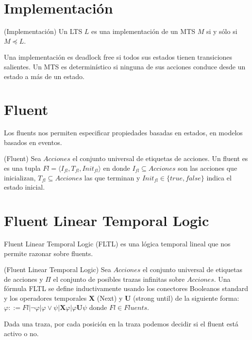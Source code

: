 \section{Implementación}

\begin{definition}{(Implementación)}
Un LTS $L$ es una implementación de un MTS $M$ si y sólo si $M \preceq L$.
\end{definition}

Una implementación es deadlock free si todos sus estados tienen transiciones salientes. 
Un MTS es determinístico si ninguna de sus acciones conduce desde un estado a más de un estado.

\section{Fluent}

Los fluents nos permiten especificar propiedades basadas en estados, en modelos basados en eventos.

\begin{definition}{(Fluent)}
Sea $Acciones$ el conjunto universal de etiquetas de acciones. 
Un fluent es es una tupla $Fl = \langle I_{fl}, T_{fl}, Init_{fl} \rangle$ en donde $I_{fl} \subseteq Acciones$ son las acciones 
que inicializan, $T_{fl} \subseteq Acciones$ las que terminan y $Init_{fl} \in \{true, false\}$ indica el estado inicial.
\end{definition}

\section{Fluent Linear Temporal Logic}
Fluent Linear Temporal Logic \cite{FLTL} (FLTL) es una lógica temporal lineal que nos permite razonar sobre fluents.

\begin{definition}{(Fluent Linear Temporal Logic)}
Sea $Acciones$ el conjunto universal de etiquetas de acciones y $\Pi$ el conjunto de posibles trazas infinitas sobre $Acciones$. 
Una fórmula FLTL se define inductivamente usando los conectores Booleanos standard y los operadores temporales \textbf{X} (Next) y 
\textbf{U} (strong until) de la siguiente forma:\\
$\varphi ::= Fl | \neg\varphi | \varphi \lor \psi | \textbf{X}\varphi | \varphi\textbf{U}\psi$ donde $Fl \in Fluents$.
\end{definition}

Dada una traza, por cada posición en la traza podemos decidir si el fluent está activo o no.

